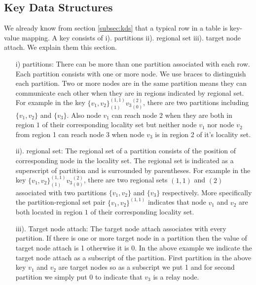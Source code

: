 \documentclass[11pt]{article}
\begin{document}
\subsection{Key Data Structures}
We already know from section \ref{subsec:kds} that a typical row in a table is key-value mapping. A key consists of 
i). partitions ii). regional set iii). target node attach. We explain them this section.


\begin{itemize}
\item[i)] partitions: There can be more than one partition associated with each row. Each partition consists with one or more node. We use braces to distinguish each partition. Two or more nodes are in the same partition means they can communicate each other when they are in regions indicated by regional set. For example in the key $\{v_1,v_2\}^{(1,1)}_{(1)}{v_3}^{(2)}_{(0)}$, there are two partitions including $\{v_1,v_2\}$ and $\{v_3\}$. Also node $v_1$ can reach node $2$ when they are both in region $1$ of their corresponding locality set but neither node $v_1$ nor node $v_2$  from region 1 can reach node 3 when node $v_3$ is in region 2 of it's locality set.
\item[ii).] regional set: The regional set of a partition consists of the position of corresponding node in the locality set. The regional set is indicated as a superscript of partition and is surrounded by parentheses. For example in the key $\{v_1,v_2\}^{(1,1)}_{(1)}{v_3}^{(2)}_{(0)}$, there are two regional sets $(1,1)$ and $(2)$ associated with two partitions $\{v_1,v_2\}$ and $\{v_3\}$ respectively. More specifically the partition-regional set pair $\{v_1,v_2\}^{(1,1)}$ indicates that node $v_1$ and $v_2$ are both located in region $1$ of their corresponding locality set.
\item[iii).] Target node attach: The target node attach associates with every partition. If there is one or more target node in a partition then the value of target node attach is 1 otherwise it is 0. In the above example we indicate the target node attach as a subscript of the partition. First partition in the above key $v_1$ and $v_2$ are target nodes so as a subscript we put 1 and for second partition we simply put 0 to indicate that $v_3$ is a relay node.
\end{itemize}
\end{document}
